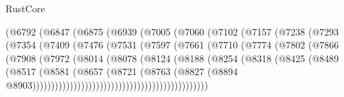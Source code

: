 \begin{lexlean}{RustCore}
\begin{coremodule}
                        (@6792
                          (@6847
                            (@6875
                              (@6939
                                (@7005
                                  (@7060
                                    (@7102
                                      (@7157
                                        (@7238
                                          (@7293
                                            (@7354
                                              (@7409
                                                (@7476
                                                  (@7531
                                                    (@7597
                                                      (@7661
                                                        (@7710
                                                          (@7774
                                                            (@7802
                                                              (@7866
                                                                (@7908
                                                                  (@7972
                                                                    (@8014
                                                                      (@8078
                                                                        (@8124
                                                                          (@8188
                                                                            (@8254
                                                                              (@8318
                                                                                (@8425
                                                                                  (@8489
                                                                                    (@8517
                                                                                      (@8581
                                                                                        (@8657
                                                                                          (@8721
                                                                                            (@8763
                                                                                              (@8827
                                                                                                (@8894
                                                                                                  @8903)))))))))))))))))))))))))))))))))))))))))))))))

\end{coremodule}
\end{lexlean}
